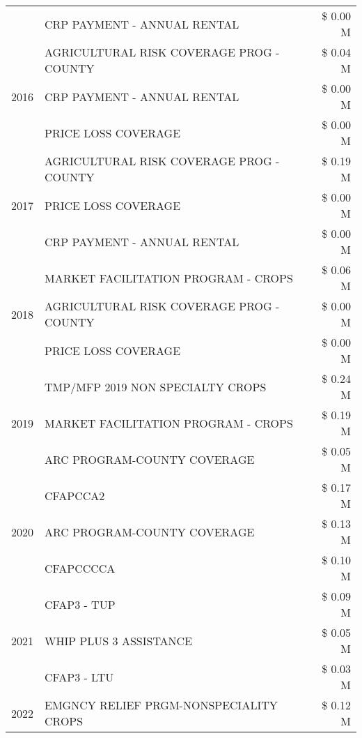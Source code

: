 \begin{tabular}{llr}
 & CRP PAYMENT - ANNUAL RENTAL & \$ 0.00 M \\
\cline{1-3}
\multirow[t]{3}{*}{2016} & AGRICULTURAL RISK COVERAGE PROG - COUNTY & \$ 0.04 M \\
 & CRP PAYMENT - ANNUAL RENTAL & \$ 0.00 M \\
 & PRICE LOSS COVERAGE & \$ 0.00 M \\
\cline{1-3}
\multirow[t]{3}{*}{2017} & AGRICULTURAL RISK COVERAGE PROG - COUNTY & \$ 0.19 M \\
 & PRICE LOSS COVERAGE & \$ 0.00 M \\
 & CRP PAYMENT - ANNUAL RENTAL & \$ 0.00 M \\
\cline{1-3}
\multirow[t]{3}{*}{2018} & MARKET FACILITATION PROGRAM - CROPS & \$ 0.06 M \\
 & AGRICULTURAL RISK COVERAGE PROG - COUNTY & \$ 0.00 M \\
 & PRICE LOSS COVERAGE & \$ 0.00 M \\
\cline{1-3}
\multirow[t]{3}{*}{2019} & TMP/MFP 2019 NON SPECIALTY CROPS & \$ 0.24 M \\
 & MARKET FACILITATION PROGRAM - CROPS & \$ 0.19 M \\
 & ARC PROGRAM-COUNTY COVERAGE & \$ 0.05 M \\
\cline{1-3}
\multirow[t]{3}{*}{2020} & CFAPCCA2 & \$ 0.17 M \\
 & ARC PROGRAM-COUNTY COVERAGE & \$ 0.13 M \\
 & CFAPCCCCA & \$ 0.10 M \\
\cline{1-3}
\multirow[t]{3}{*}{2021} & CFAP3 - TUP & \$ 0.09 M \\
 & WHIP PLUS 3 ASSISTANCE & \$ 0.05 M \\
 & CFAP3 - LTU & \$ 0.03 M \\
\cline{1-3}
2022 & EMGNCY RELIEF PRGM-NONSPECIALITY CROPS & \$ 0.12 M \\
\cline{1-3}
\bottomrule
\end{tabular}
